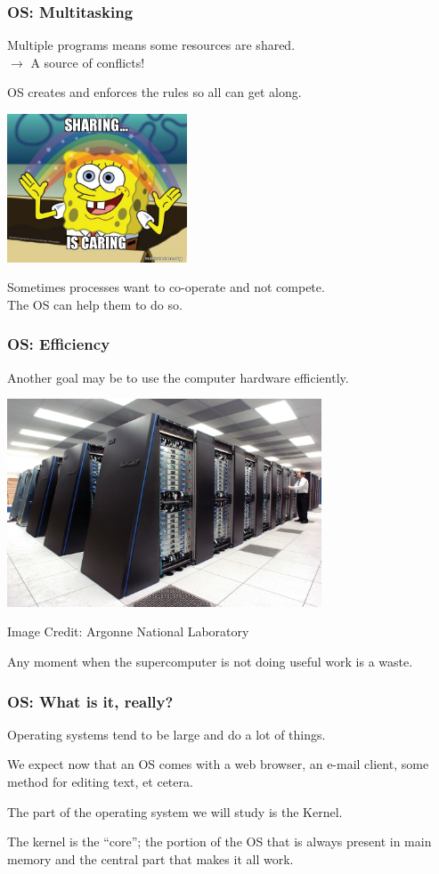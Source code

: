 \begin{frame}
\frametitle{OS: Multitasking}
Multiple programs means some resources are shared.\\
\quad $\rightarrow$ A source of conflicts!

OS creates and enforces the rules so all can get along.

\begin{center}
	\includegraphics[width=0.4\textwidth]{images/sharing-is-caring.jpg}
\end{center}

Sometimes processes want to co-operate and not compete.\\
\quad The OS can help them to do so.


\end{frame}

\begin{frame}
\frametitle{OS: Efficiency}
Another goal may be to use the computer hardware efficiently.

\begin{center}
	\includegraphics[width=0.7\textwidth]{images/supercomputer.jpg}
\end{center}
\hfill Image Credit: Argonne National Laboratory

Any moment when the supercomputer is not doing useful work is a waste.

\end{frame}

\begin{frame}
\frametitle{OS: What is it, really?}

Operating systems tend to be large and do a lot of things. 

We expect now that an OS comes with a web browser, an e-mail client, some method for editing text, et cetera. 

The part of the operating system we will study is the \alert{Kernel}.

The kernel is the ``core''; the portion of the OS that is always present in main memory and the central part that makes it all work.

\end{frame}


